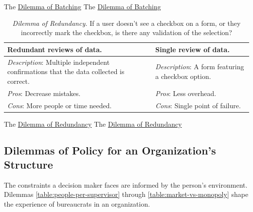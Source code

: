 The \href{table:dilemma-of-batching}{Dilemma of Batching}
The \href{table:dilemma-of-batching}{Dilemma of Batching}


\begin{center}
\begin{table}[H] %
\begin{tabular}{ | m{\dilemmatablewidth}| m{\dilemmatablewidth} | } 
  \hline
  \textbf{Redundant reviews of data.} &
  \textbf{Single review of data.} \\
  \hline
  \textit{Description}: Multiple independent confirmations that the data collected is correct. & 
  \textit{Description}: A form featuring a checkbox option.  \\
  \hline
  \textit{Pros}: Decrease mistakes. & 
  \textit{Pros}: Less overhead. \\
  \hline
  \textit{Cons}: More people or time needed. & 
  \textit{Cons}: Single point of failure. \\
  \hline
\end{tabular}
\caption{
\textit{Dilemma of Redundancy.}
If a user doesn't see a checkbox on a form, or they incorrectly mark the checkbox, is there any validation of the selection?
}
\label{table:dilemma-of-redundancy}
\end{table}
\end{center}


The \href{table:dilemma-of-redundancy}{Dilemma of Redundancy}
The \href{table:dilemma-of-redundancy}{Dilemma of Redundancy}


\subsection*{Dilemmas of Policy for an Organization's Structure\label{sec:org-dilemma}}

The constraints a decision maker faces are informed by the person's environment. Dilemmas \ref{table:people-per-supervisor} through \ref{table:market-vs-monopoly} shape the experience of bureaucrats in an organization.

